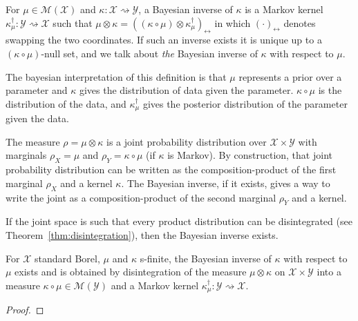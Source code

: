 \begin{definition}
  \label{def:bayesInv}
  \leanok
  For $\mu \in \mathcal M(\mathcal X)$ and $\kappa : \mathcal X \rightsquigarrow \mathcal Y$, a Bayesian inverse of $\kappa$ is a Markov kernel $\kappa_\mu^\dagger : \mathcal Y \rightsquigarrow \mathcal X$ such that $\mu \otimes \kappa = ((\kappa \circ \mu) \otimes \kappa_\mu^\dagger)_\leftrightarrow$ in which $(\cdot)_\leftrightarrow$ denotes swapping the two coordinates.
  If such an inverse exists it is unique up to a $(\kappa \circ \mu)$-null set, and we talk about \emph{the} Bayesian inverse of $\kappa$ with respect to $\mu$.
\end{definition}

The bayesian interpretation of this definition is that $\mu$ represents a prior over a parameter and $\kappa$ gives the distribution of data given the parameter. $\kappa \circ \mu$ is the distribution of the data, and $\kappa_\mu^\dagger$ gives the posterior distribution of the parameter given the data.

The measure $\rho = \mu \otimes \kappa$ is a joint probability distribution over $\mathcal X \times \mathcal Y$ with marginals $\rho_X = \mu$ and $\rho_Y = \kappa \circ \mu$ (if $\kappa$ is Markov). By construction, that joint probability distribution can be written as the composition-product of the first marginal $\rho_X$ and a kernel $\kappa$. The Bayesian inverse, if it exists, gives a way to write the joint as a composition-product of the second marginal $\rho_Y$ and a kernel. 

If the joint space is such that every product distribution can be disintegrated (see Theorem~\ref{thm:disintegration}), then the Bayesian inverse exists.

\begin{lemma}
  \label{lem:exists_bayesInv}
  \leanok
  For $\mathcal X$ standard Borel, $\mu$ and $\kappa$ s-finite, the Bayesian inverse of $\kappa$ with respect to $\mu$ exists and is obtained by disintegration of the measure $\mu \otimes \kappa$ on $\mathcal X \times \mathcal Y$ into a measure $\kappa \circ \mu \in \mathcal M(\mathcal Y)$ and a Markov kernel $\kappa_\mu^\dagger : \mathcal Y \rightsquigarrow \mathcal X$.
\end{lemma}

\begin{proof}\leanok
{}

\end{proof}


